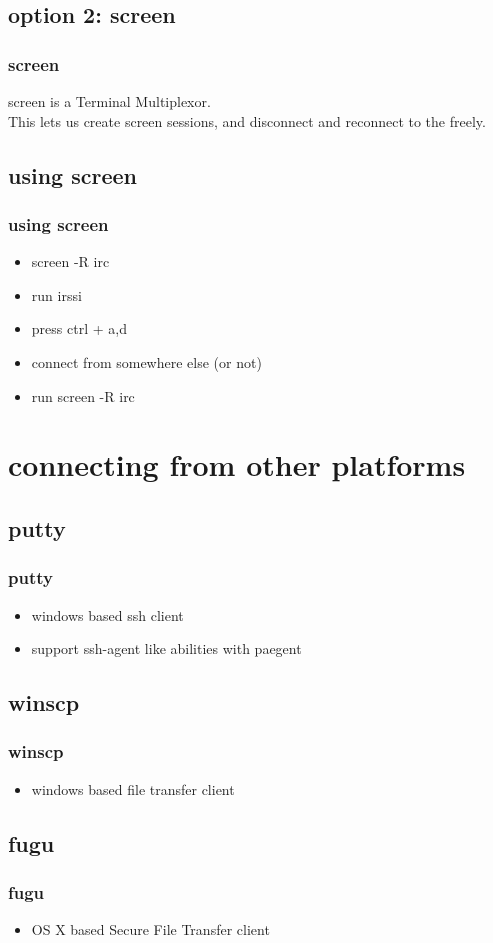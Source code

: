 \documentclass[hyperref={pdfpagelabels=false}]{beamer}
\begin{document}
\subsection{option 2: screen}
\frame
{
  \frametitle{screen}
  screen is a Terminal Multiplexor.\\
  This lets us create screen sessions, and disconnect and reconnect to the freely.
}
\subsection{using screen}
\frame
{
  \frametitle{using screen}
  \begin{itemize}
  \item{screen -R irc}
  \item{run irssi}
  \item{press ctrl + a,d}
  \item{connect from somewhere else (or not)}
  \item{run screen -R irc}
  \end{itemize}
}

\section{connecting from other platforms}
\subsection{putty}
\frame
{
    \frametitle{putty}
    \begin{itemize}
    \item{windows based ssh client}
    \item{support ssh-agent like abilities with paegent}
    \end{itemize}
}
\subsection{winscp}
\frame
{
    \frametitle{winscp}
    \begin{itemize}
    \item{windows based file transfer client}
    \end{itemize}
}
\subsection{fugu}
\frame
{
    \frametitle{fugu}
    \begin{itemize}
    \item{OS X based Secure File Transfer client}
    \end{itemize}
}
\end{document}
